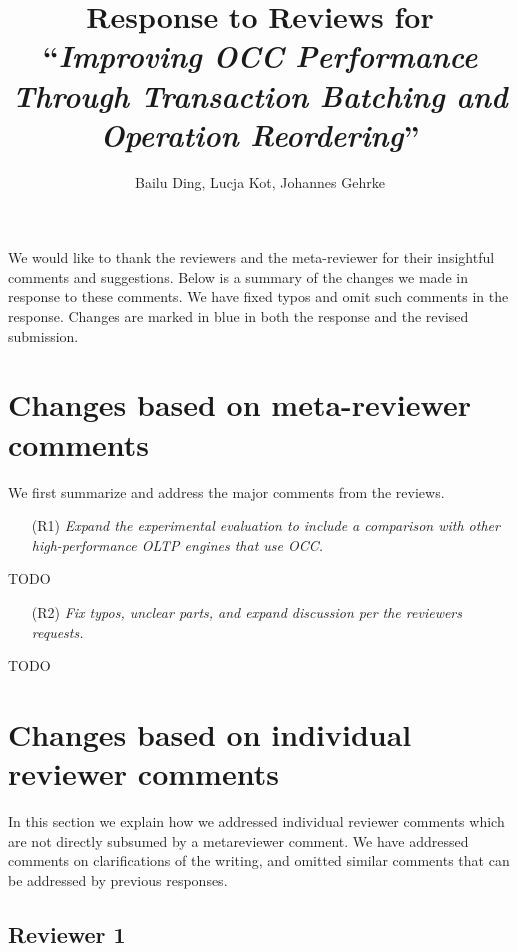 \documentclass{article}
\newcommand{\changed}[1]{#1}
\newcommand{\changed}[1]{{\color{blue}#1}}
\begin{document}
\title{Response to Reviews for ``\emph{Improving OCC Performance Through Transaction Batching and Operation Reordering}''}
\author{Bailu Ding, Lucja Kot, Johannes Gehrke}
\date{}
\maketitle

We would like to thank the reviewers and the meta-reviewer for their insightful comments and suggestions. Below is a summary of the changes we made in response to these comments. We have fixed typos and omit such comments in the response. Changes are marked in blue in both the response and the revised submission.

\section{Changes based on meta-reviewer comments}

We first summarize and address the major comments from the reviews.

\begin{itemize}
	\item[(R1)] \emph{Expand the experimental evaluation to include a comparison with other high-performance OLTP engines that use OCC.}
\end{itemize}

\changed{
	TODO
}

\begin{itemize}
	\item[(R2)] \emph{Fix typos, unclear parts, and expand discussion per the reviewers requests.}
\end{itemize}

\changed{
	TODO
}

\section{Changes based on individual reviewer comments}

In this section we explain how we addressed individual reviewer comments which are not directly subsumed by a metareviewer comment. We have addressed comments on clarifications of the writing, and omitted similar comments that can be addressed by previous responses.

\subsection{Reviewer 1}
\end{document}
